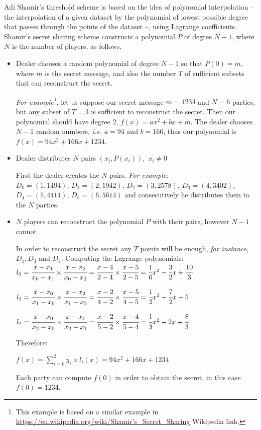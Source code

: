 Adi Shamir's threshold scheme is based on the idea of polynomial interpolation -- the interpolation of a given dataset by the polynomial of lowest possible degree that passes through the points of the dataset --, using Lagrange coefficients.
Shamir's secret sharing scheme constructs a polynomial $P$ of degree $N-1$, where $N$ is the number of players, as follows.

\begin{itemize}
  \item Dealer chooses a random polynomial of degree $N − 1$ so that $P(0) = m$, where $m$ is the secret message, and also the number $T$ of sufficient subsets that can reconstruct the secret.

  \textit{For example\footnote{This example is based on a similar example in \url{https://en.wikipedia.org/wiki/Shamir's_Secret_Sharing} Wikipedia link.}}, let us suppose our secret message $m = 1234$ and $N = 6$ parties, but any subset of $T = 3$ is sufficient to reconstruct the secret.
  Then our polynomial should have degree 2, $f(x) = ax^2 + bx + m$.
  The dealer chooses $N - 1$ random numbers, \textit{i.e.} $a = 94$ and $b = 166$, thus our polynomial is $f(x) = 94x^2 + 166x + 1234$.


  \item Dealer distributes $N$ pairs $(x_i , P(x_i)),$ $x_i \neq 0$

  First the dealer creates the $N$ pairs.
  \textit{For example}:\\
  $D_0 = (1, 1494)$, $D_1 = (2, 1942)$, $D_2 = (3, 2578)$, $D_3 = (4, 3402)$, $D_4 = (5, 4414)$, $D_5 = (6, 5614)$ and consecutively he distributes them to the $N$ parties.


  \item $N$ players can reconstruct the polynomial $P$ with their pairs, however $N - 1$ cannot

  In order to reconstruct the secret any $T$ points will be enough, \textit{for instance}, $D_1, D_3$ and $D_4$.
  Computing the Lagrange polynomials:\\
  $l_0 = \cfrac{x - x_1}{x_0 - x_1} \times \cfrac{x - x_2}{x_0 - x_2} = \cfrac{x - 4}{2 - 4} \times \cfrac{x - 5}{2 - 5} = \cfrac{1}{6}x^2 - \cfrac{3}{2}x + \cfrac{10}{3}$

  $l_1 = \cfrac{x - x_0}{x_1 - x_0} \times \cfrac{x - x_2}{x_1 - x_2} = \cfrac{x - 2}{4 - 2} \times \cfrac{x - 5}{4 - 5} = \cfrac{1}{2}x^2 + \cfrac{7}{2}x - 5$

  $l_2 = \cfrac{x - x_0}{x_2 - x_0} \times \cfrac{x - x_1}{x_2 - x_1} = \cfrac{x - 2}{5 - 2} \times \cfrac{x - 4}{5 - 4} = \cfrac{1}{3}x^2 - 2x + \cfrac{8}{3}$

  Therefore:

  $f(x) = \sum_{i=0}^{2} y_i \times l_i(x) = 94x^2 + 166x + 1234$

  Each party can compute $f(0)$ in order to obtain the secret, in this case $f(0) = 1234$.
\end{itemize}

